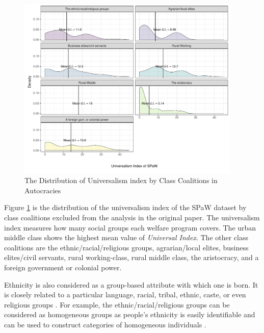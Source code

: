 \documentclass[12pt]{article}
\begin{document}
	\begin{figure}[!ht]
		\centering
		\includegraphics[width=0.95\textwidth]{"2_Figures/Appendix/Appendix4"}
		\caption{The Distribution of Universalism index by Class Coalitions in Autocracies}
		\label{fig:figure8}
	\end{figure}
	
	Figure \ref{fig:figure8} is the distribution of the universalism index of the SPaW dataset by class coalitions excluded from the analysis in the original paper. The universalism index measures how many social groups each welfare program covers. The urban middle class shows the highest mean value of \textit{Universal Index}. The other class coalitions are the ethnic/racial/religious groups, agrarian/local elites, business elites/civil servants, rural working-class, rural middle class, the aristocracy, and a foreign government or colonial power.
	
	Ethnicity is also considered as a group-based attribute with which one is born. It is closely related to a particular language, racial, tribal, ethnic, caste, or even religious groups \citep[41]{Huber2017}. For example, the ethnic/racial/religious groups can be considered as homogeneous groups as people's ethnicity is easily identifiable and can be used to construct categories of homogeneous individuals \citep{Alesina2005}. 
	
\end{document}
